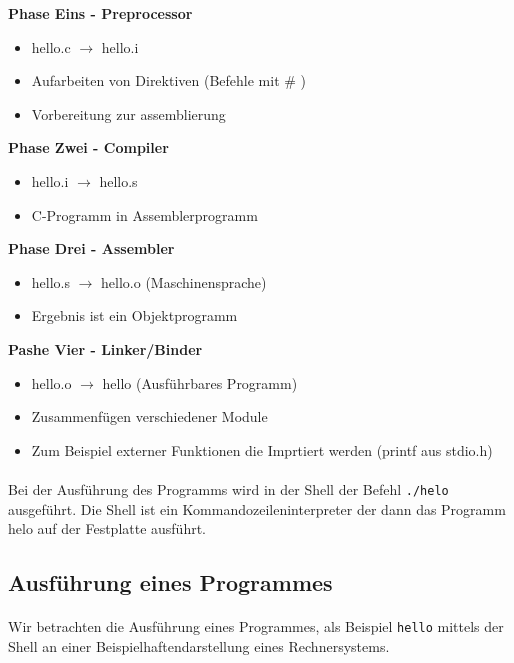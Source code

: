 		\textbf{Phase Eins - Preprocessor}
		\begin{itemize}
			\item hello.c $\rightarrow$ hello.i
			\item Aufarbeiten von Direktiven (Befehle mit \# )
			\item Vorbereitung zur assemblierung
		\end{itemize}
		\vspace{0.5cm}

		\textbf{Phase Zwei - Compiler}
		\begin{itemize}
			\item hello.i $\rightarrow$ hello.s
			\item C-Programm in Assemblerprogramm
		\end{itemize}
		\vspace{0.5cm}

		\textbf{Phase Drei - Assembler}
		\begin{itemize}
			\item hello.s $\rightarrow$ hello.o (Maschinensprache)
			\item Ergebnis ist ein Objektprogramm
		\end{itemize}
		\vspace{0.5cm}

		\textbf{Pashe Vier - Linker/Binder}
		\begin{itemize}
			\item hello.o $\rightarrow$ hello (Ausführbares Programm)
			\item Zusammenfügen verschiedener Module
			\item Zum Beispiel externer Funktionen die Imprtiert werden (printf aus stdio.h)
		\end{itemize}
		\vspace{0.5cm}

		\paragraph{} Bei der Ausführung des Programms wird in der Shell der Befehl
		\texttt{./helo} ausgeführt. Die Shell ist ein Kommandozeileninterpreter der dann
		das Programm helo auf der Festplatte ausführt.



	\subsection{Ausführung eines Programmes}
		\paragraph{} Wir betrachten die Ausführung eines Programmes, als Beispiel \texttt{hello}
		mittels der Shell an einer Beispielhaftendarstellung eines Rechnersystems.

